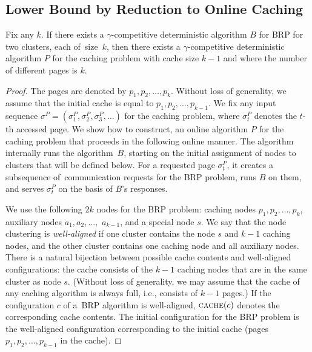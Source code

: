 \subsection{Lower Bound by Reduction to Online Caching}
\label{sec:paging}

\begin{theorem}
Fix any $k$. If there exists a $\gamma$-competitive deterministic algorithm $B$
for BRP for two clusters, each of~size~$k$, then there exists a
$\gamma$-competitive deterministic algorithm $P$ for the caching problem with 
cache size $k-1$ and where the number of different pages is $k$.
\end{theorem}

\begin{proof}
The pages are denoted by $p_1,p_2,\ldots,p_k$. Without loss of generality, we
assume that the initial cache is equal to $p_1,p_2,\ldots,p_{k-1}$. We fix any
input sequence $\sigma^P = (\sigma^P_1, \sigma^P_2, \sigma^P_3, \ldots)$ for the
caching problem, where $\sigma^P_t$ denotes the $t$-th accessed page. We show
how to construct, an online algorithm $P$ for the caching 
problem that proceeds in the following online manner. 
The algorithm internally runs the algorithm~$B$, 
starting on the initial assignment of nodes to clusters that will be
defined below. For a requested page $\sigma^P_t$, it creates a subsequence
of~communication requests for the BRP problem, runs $B$ on them, and serves
$\sigma^P_t$ on the basis of $B$'s responses.

We use the following $2k$ nodes for the BRP problem: caching nodes $p_1,p_2,
\ldots, p_k$, auxiliary nodes $a_1,a_2,\ldots,$ $a_{k-1}$, and a special node
$s$. We say that the node clustering is \emph{well-aligned} if one cluster
contains the node $s$ and $k-1$ caching nodes, and the other cluster contains
one caching node and all auxiliary nodes. There is a natural bijection between
possible cache contents and well-aligned configurations: the cache consists of
the $k-1$ caching nodes that are in the same cluster as node $s$. (Without loss
of generality, we may assume that the cache of any caching algorithm is always
full, i.e., consists of $k-1$ pages.) If the configuration $c$ of a~BRP
algorithm is well-aligned, $\textsc{cache}(c)$ denotes the corresponding cache
contents.
The initial configuration for the BRP problem is the well-aligned
configuration corresponding to the initial cache (pages
$p_1,p_2,\ldots,p_{k-1}$ in the cache).


\end{proof}
